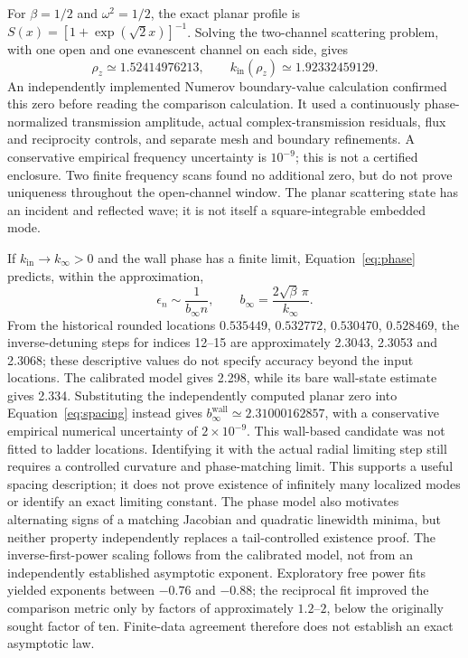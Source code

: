 For $\beta=1/2$ and $\omega^2=1/2$, the exact planar profile is
$S(x)=[1+\exp(\sqrt2 x)]^{-1}$. Solving the two-channel scattering
problem, with one open and one evanescent channel on each side, gives
\begin{equation}\label{eq:planarzero}
\rho_z\simeq1.52414976213,\qquad
k_{\mathrm{in}}(\rho_z)\simeq1.92332459129.
\end{equation}
An independently implemented Numerov boundary-value calculation confirmed
this zero before reading the comparison calculation. It used a continuously
phase-normalized transmission amplitude, actual complex-transmission
residuals, flux and reciprocity controls, and separate mesh and boundary
refinements. A conservative empirical frequency uncertainty is $10^{-9}$;
this is not a certified enclosure. Two finite frequency scans found no
additional zero, but do not prove uniqueness throughout the open-channel
window. The planar scattering state has an incident and reflected wave;
it is not itself a square-integrable embedded mode.

If $k_{\mathrm{in}}\to k_\infty>0$ and the wall phase has a finite limit,
Equation~\eqref{eq:phase} predicts, within the approximation,
\begin{equation}\label{eq:spacing}
\epsilon_n\sim\frac1{b_\infty n},\qquad
b_\infty=\frac{2\sqrt\beta\,\pi}{k_\infty}.
\end{equation}
From the historical rounded locations $0.535449$, $0.532772$,
$0.530470$, $0.528469$, the inverse-detuning steps for indices 12--15
are approximately 2.3043, 2.3053 and 2.3068;
these descriptive values do not specify accuracy beyond the input locations.
The calibrated model gives 2.298, while its bare
wall-state estimate gives 2.334. Substituting the independently computed
planar zero into Equation~\eqref{eq:spacing} instead gives
$b_\infty^{\mathrm{wall}}\simeq2.31000162857$, with a conservative empirical
numerical uncertainty of $2\times10^{-9}$. This wall-based candidate was not
fitted to ladder locations. Identifying it with the actual radial limiting
step still requires a controlled curvature and phase-matching limit.
This supports a useful spacing description;
it does not prove existence of infinitely many localized modes or identify
an exact limiting constant. The phase model also motivates alternating
signs of a matching Jacobian and quadratic linewidth minima, but neither
property independently replaces a tail-controlled existence proof.
The inverse-first-power scaling follows from the calibrated model, not
from an independently established asymptotic exponent. Exploratory free
power fits yielded exponents between $-0.76$ and $-0.88$; the reciprocal
fit improved the comparison metric only by factors of approximately
$1.2$--$2$, below the originally sought factor of ten. Finite-data agreement
therefore does not establish an exact asymptotic law.

